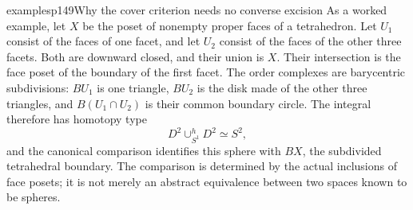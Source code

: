 \begin{dcomment}{examples}{p149}{Why the cover criterion needs no converse excision}
As a worked example, let $X$ be the poset of nonempty proper faces of a tetrahedron. Let $U_1$ consist of the faces of one facet, and let $U_2$ consist of the faces of the other three facets. Both are downward closed, and their union is $X$. Their intersection is the face poset of the boundary of the first facet. The order complexes are barycentric subdivisions: $BU_1$ is one triangle, $BU_2$ is the disk made of the other three triangles, and $B(U_1\cap U_2)$ is their common boundary circle. The integral therefore has homotopy type
\[
 D^2\mathop{\cup}^{h}_{S^1}D^2\simeq S^2,
\]
and the canonical comparison identifies this sphere with $BX$, the subdivided tetrahedral boundary. The comparison is determined by the actual inclusions of face posets; it is not merely an abstract equivalence between two spaces known to be spheres.
\end{dcomment}

